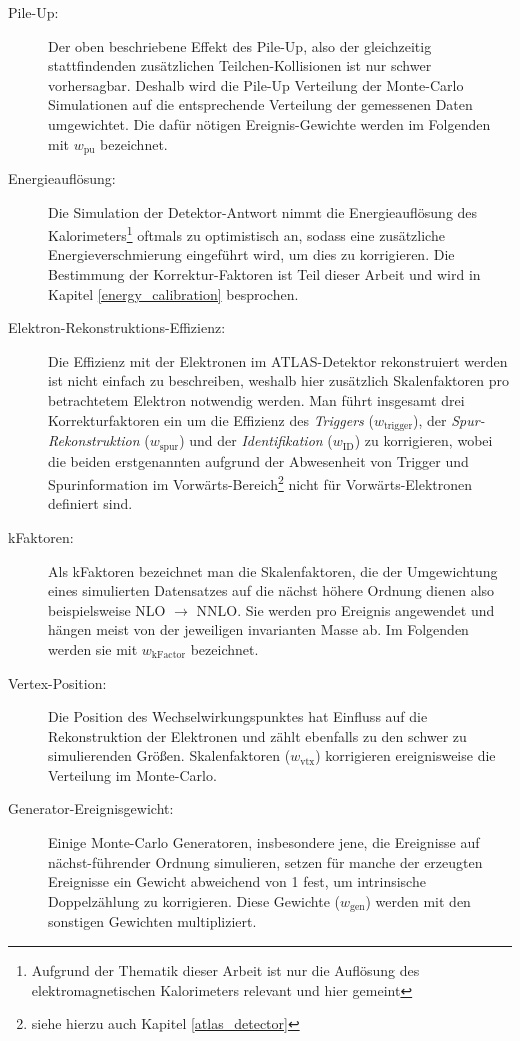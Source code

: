 \begin{description}
    \item[Pile-Up:] Der oben beschriebene Effekt des Pile-Up, also der
        gleichzeitig stattfindenden zusätzlichen Teilchen-Kollisionen ist nur
        schwer vorhersagbar. Deshalb wird die Pile-Up Verteilung der
        Monte-Carlo Simulationen auf die entsprechende Verteilung der
        gemessenen Daten umgewichtet. Die dafür nötigen Ereignis-Gewichte
        werden im Folgenden mit $w_\text{pu}$ bezeichnet.
    \item[Energieauflösung:] Die Simulation der Detektor-Antwort nimmt die
        Energieauflösung des Kalorimeters\footnote{Aufgrund der Thematik dieser
        Arbeit ist nur die Auflösung des elektromagnetischen Kalorimeters
        relevant und hier gemeint} oftmals zu optimistisch an, sodass eine
        zusätzliche Energieverschmierung eingeführt wird, um dies zu
        korrigieren. Die Bestimmung der Korrektur-Faktoren ist Teil dieser
        Arbeit und wird in Kapitel \ref{energy_calibration} besprochen.
    \item[Elektron-Rekonstruktions-Effizienz:] Die Effizienz mit der Elektronen
        im ATLAS-Detektor rekonstruiert werden ist nicht einfach zu
        beschreiben, weshalb hier zusätzlich Skalenfaktoren pro betrachtetem
        Elektron notwendig werden. Man führt insgesamt drei Korrekturfaktoren
        ein um die Effizienz des \textit{Triggers} ($w_\text{trigger}$), der 
        \textit{Spur-Rekonstruktion} ($w_\text{spur}$) und der
        \textit{Identifikation} ($w_\text{ID}$) zu korrigieren, wobei die
        beiden erstgenannten aufgrund der Abwesenheit von Trigger und
        Spurinformation im Vorwärts-Bereich\footnote{siehe hierzu auch Kapitel
        \ref{atlas_detector}} nicht für Vorwärts-Elektronen definiert sind.
    \item[kFaktoren:] Als kFaktoren bezeichnet man die Skalenfaktoren, die der
        Umgewichtung eines simulierten Datensatzes auf die nächst höhere
        Ordnung dienen also beispielsweise NLO $\rightarrow$ NNLO. Sie werden
        pro Ereignis angewendet und hängen meist von der jeweiligen
        invarianten Masse ab. Im Folgenden werden sie mit $w_\text{kFactor}$
        bezeichnet.
    \item[Vertex-Position:] Die Position des Wechselwirkungspunktes hat
        Einfluss auf die Rekonstruktion der Elektronen und zählt ebenfalls zu
        den schwer zu simulierenden Größen. Skalenfaktoren ($w_\text{vtx}$)
        korrigieren ereignisweise die Verteilung im Monte-Carlo.
    \item[Generator-Ereignisgewicht:] Einige Monte-Carlo Generatoren,
        insbesondere jene, die Ereignisse auf nächst-führender Ordnung
        simulieren, setzen für manche der erzeugten Ereignisse ein Gewicht
        abweichend von 1 fest, um intrinsische Doppelzählung zu korrigieren.
        Diese Gewichte ($w_\text{gen}$) werden mit den sonstigen Gewichten
        multipliziert.
\end{description}

